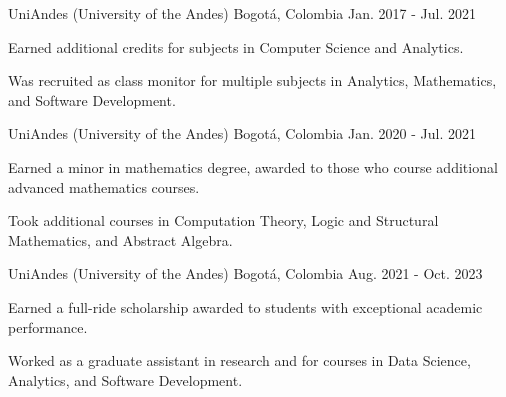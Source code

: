 

\begin{cventries}

	{UniAndes (University of the Andes)} %
	{Bogotá, Colombia} %
	{Jan. 2017 {-} Jul. 2021} %
	{
		\begin{cvitems} %
			\item {Earned additional credits for subjects in Computer Science and Analytics.}
			\item {Was recruited as class monitor for multiple subjects in Analytics, Mathematics, and Software Development.}
		\end{cvitems}
	}

	{UniAndes (University of the Andes)} %
	{Bogotá, Colombia} %
	{Jan. 2020 {-} Jul. 2021} %
	{
		\begin{cvitems} %
			\item {Earned a minor in mathematics degree, awarded to those who course additional advanced mathematics courses.}
			\item {Took additional courses in Computation Theory, Logic and Structural Mathematics, and Abstract Algebra.}
		\end{cvitems}
	}


	{UniAndes (University of the Andes)} %
	{Bogotá, Colombia} %
	{Aug. 2021 {-} Oct. 2023} %
	{
		\begin{cvitems} %
			\item {Earned a full-ride scholarship awarded to students with exceptional academic performance.}
			\item {Worked as a graduate assistant in research and for courses in Data Science, Analytics, and Software Development.}
		\end{cvitems}
	}

\end{cventries}
